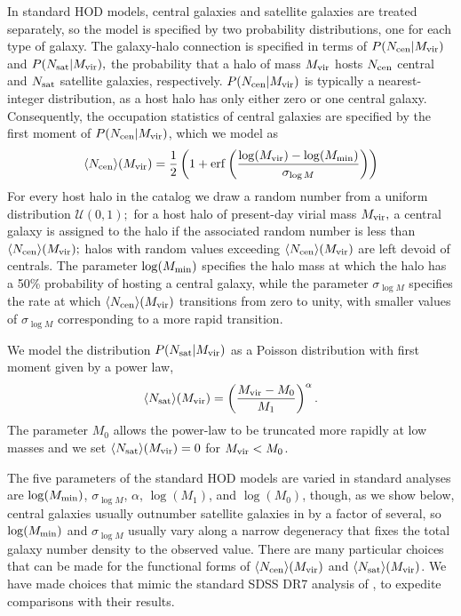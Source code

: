 \documentclass[usenatbib,usegraphicx,letterpaper]{mn2e}
\newcommand{\mvir}{M_{\rm vir}}
\newcommand{\ncen}{N_{\rm cen}}
\newcommand{\nsat}{N_{\rm sat}}
\begin{document}
In standard HOD models, central galaxies and satellite galaxies are treated separately, so 
the model is specified by two probability distributions, one for each type of galaxy. 
The galaxy-halo connection is specified in terms of $P(\ncen|\mvir)$ and $P(\nsat|\mvir),$ 
the probability that a halo of mass $\mvir$ hosts $\ncen$ central and $\nsat$ satellite galaxies, 
respectively. $P(\ncen|\mvir)$ is typically a nearest-integer distribution, as a host halo has only 
either zero or one central galaxy. Consequently, the occupation statistics of central galaxies are 
specified by the first moment of $P(\ncen|\mvir)$, which we model as 
%
\begin{equation}
\label{eq:ncen}
\langle N_{\mathrm{cen}} \rangle(\mvir) =
        \frac{1}{2}\left( 1 +
        \mathrm{erf}\left( \frac{\log (\mvir) -
        \log (M_{\rm min})}{\sigma_{\log M}} \right) \right)
\end{equation}
%
For every host halo in the catalog we draw a random number from a uniform distribution $\mathcal{U}(0, 1);$ for a host halo of present-day virial mass $\mvir,$ a central galaxy is assigned to the halo if the associated random number is less than $\langle N_{\mathrm{cen}} \rangle(\mvir);$ halos with random values exceeding  $\langle N_{\mathrm{cen}} \rangle(\mvir)$ are left devoid of centrals. 
The parameter $\log (M_{\rm min})$ specifies the halo mass at which the halo has a 50\% probability of hosting a 
central galaxy, while the parameter $\sigma_{\log M}$ specifies the rate at which $\langle N_{\mathrm{cen}} \rangle (\mvir)$ 
transitions from zero to unity, with smaller values of $\sigma_{\log M}$ corresponding to a more rapid transition. 


We model the distribution $P(\nsat|\mvir)$ as a Poisson distribution with first moment given by a power law, 
%
\begin{equation}
\label{eq:nsat}
\langle N_{\rm sat}\rangle(\mvir) = \left( \frac{\mvir - M_0}{M_1} \right)^{\alpha}. 
\end{equation}
%
The parameter $M_0$ allows the power-law to be truncated more rapidly at low masses and we 
set $\langle N_{\rm sat}\rangle (\mvir) = 0$ for $\mvir < M_0$. 


The five parameters of the standard HOD models are varied in standard analyses are $\log (M_{\rm min})$, 
$\sigma_{\log M}$, $\alpha$, $\log (M_1)$, and $\log (M_0)$, though, as we show below, central galaxies usually 
outnumber satellite galaxies in by a factor of several, so $\log (M_{\rm min})$ and $\sigma_{\log M}$ usually 
vary along a narrow degeneracy that fixes the total galaxy number density to the observed value. There are 
many particular choices that can be made for the functional forms of $\langle N_{\rm cen}\rangle (\mvir)$ and 
$\langle N_{\rm sat}\rangle (\mvir)$. We have made choices that mimic the standard SDSS DR7 analysis of 
\citet{zehavi_etal11}, to expedite comparisons with their results.
\end{document}
